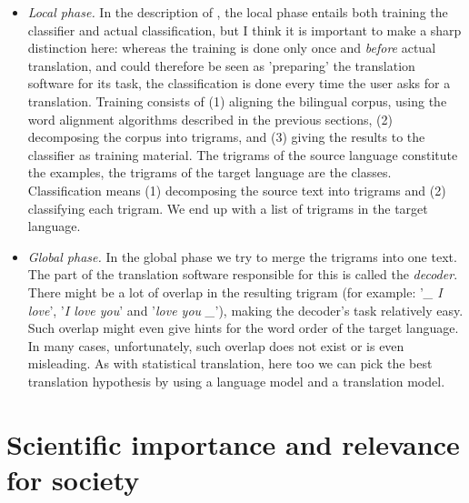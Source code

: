 \documentclass[12pt]{article}
\begin{document}
\begin{itemize}
\item \emph{Local phase.} In the description of \citet{vdbb09}, the local phase entails both training the classifier and actual classification, but I think it is important to make a sharp distinction here: whereas the training is done only once and \emph{before} actual translation, and could therefore be seen as 'preparing' the translation software for its task, the classification is done every time the user asks for a translation. Training consists of (1) aligning the bilingual corpus, using the word alignment algorithms described in the previous sections, (2) decomposing the corpus into trigrams, and (3) giving the results to the classifier as training material. The trigrams of the source language constitute the examples, the trigrams of the target language are the classes. Classification means (1) decomposing the source text into trigrams and (2) classifying each trigram. We end up with a list of trigrams in the target language.

\item \emph{Global phase.} In the global phase we try to merge the trigrams into one text. The part of the translation software responsible for this is called the \emph{decoder}. There might be a lot of overlap in the resulting trigram (for example: '\emph{\_ I love}', '\emph{I love you}' and '\emph{love you \_}'), making the decoder's task relatively easy. Such overlap might even give hints for the word order of the target language. In many cases, unfortunately, such overlap does not exist or is even misleading. As with statistical translation, here too we can pick the best translation hypothesis by using a language model and a translation model. 


\end{itemize}


\section{Scientific importance and relevance for society}

\end{document}
